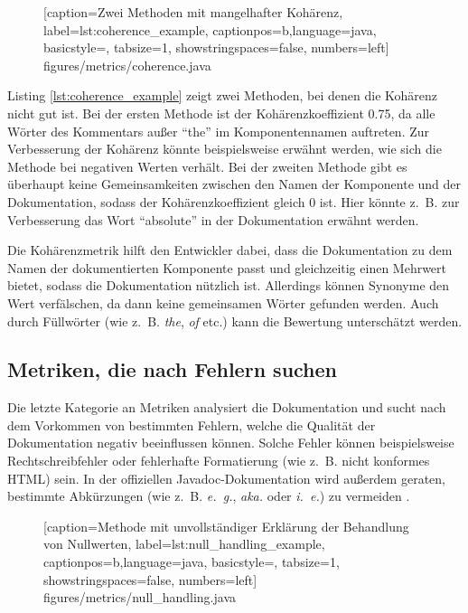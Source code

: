 	\begin{figure}
			
			[caption={Zwei Methoden mit mangelhafter Kohärenz},
			label={lst:coherence_example},
			captionpos=b,language=java, basicstyle=\footnotesize, tabsize=1, showstringspaces=false,  numbers=left]
			{figures/metrics/coherence.java}
	\end{figure}
		
 Listing \ref{lst:coherence_example} zeigt zwei Methoden, bei denen die Kohärenz nicht gut ist. Bei der ersten Methode ist der Kohärenzkoeffizient 0.75, da alle Wörter des Kommentars außer \enquote{the} im Komponentennamen auftreten. Zur Verbesserung der Kohärenz könnte beispielsweise erwähnt werden, wie sich die Methode bei negativen Werten verhält. Bei der zweiten Methode gibt es überhaupt keine Gemeinsamkeiten zwischen den Namen der Komponente und der Dokumentation, sodass der Kohärenzkoeffizient gleich 0 ist. Hier könnte z.~B. zur Verbesserung  das Wort \enquote{absolute} in der Dokumentation erwähnt werden.

Die Kohärenzmetrik hilft den Entwickler dabei, dass die Dokumentation zu dem Namen der dokumentierten Komponente passt und gleichzeitig einen Mehrwert bietet, sodass die Dokumentation nützlich ist. Allerdings können Synonyme den Wert verfälschen, da dann keine gemeinsamen Wörter gefunden werden. Auch durch Füllwörter (wie z.~B. \textit{the}, \textit{of} etc.) kann die Bewertung unterschätzt werden.

\subsection{Metriken, die  nach Fehlern suchen}\label{chapter:metrics_errors}

Die letzte Kategorie an Metriken analysiert die Dokumentation und sucht nach dem Vorkommen von bestimmten Fehlern, welche die Qualität der Dokumentation negativ beeinflussen können. Solche Fehler können beispielsweise Rechtschreibfehler oder fehlerhafte Formatierung (wie z.~B. nicht konformes \ac{HTML}) sein. In der offiziellen Javadoc-Dokumentation wird außerdem geraten, bestimmte Abkürzungen (wie z.~B. \textit{e.~g.}, \textit{aka.} oder \textit{i.~e.}) zu vermeiden \cite{HowtoWriteDocCommentsfortheJavadocTool}. 

		\begin{figure}
			
			[caption={Methode mit unvollständiger Erklärung der Behandlung von Nullwerten},
			label={lst:null_handling_example},
			captionpos=b,language=java, basicstyle=\footnotesize, tabsize=1, showstringspaces=false,  numbers=left]
			{figures/metrics/null_handling.java}
		\end{figure}
		
